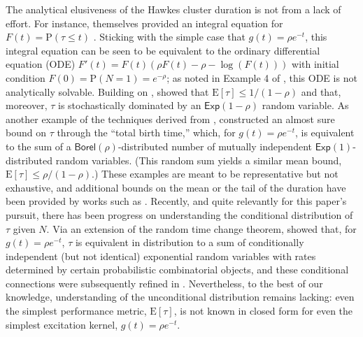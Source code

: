 \documentclass[opre,nonblindrev]{informs3_no_remark}
\newcommand{\E}[1]{{\mathrm{E}\left[#1\right]}}
\newcommand{\PP}[1]{\mathrm{P}\left( #1 \right)}
\begin{document}
The analytical elusiveness of the Hawkes cluster duration is not from a lack of effort. For instance, \citet{moller2005perfect} themselves provided an integral equation for $F(t) = \PP{\tau \leq t}$ \citep[Prop. 2 therein, which the authors describe as a generalization of Theorem 5 from][]{hawkes1974cluster}. Sticking with the simple case that $g(t) = \rho e^{-t}$, this integral equation can be seen to be equivalent to the ordinary differential equation (ODE) $F'(t) = F(t)\left(\rho F(t) - \rho - \log(F(t))\right)$ with initial condition $F(0) = \PP{N = 1} = e^{-\rho}$; as noted in Example 4 of \citet{moller2005perfect}, this ODE is not analytically solvable. Building on \citet{moller2005perfect}, \citet{graham2021regenerative} showed that $\E{\tau} \leq 1/(1-\rho)$ and that, moreover, $\tau$ is stochastically dominated by an $\mathsf{Exp}(1-\rho)$ random variable. As another example of the techniques  derived from \citet{hawkes1974cluster}, \citet{chen2021perfect} constructed an almost sure bound on $\tau$ through the ``total birth time,'' which, for $g(t) = \rho e^{-t}$, is equivalent to the sum of a $\mathsf{Borel}(\rho)$-distributed number of mutually independent $\mathsf{Exp}(1)$-distributed random variables. (This random sum yields a similar mean bound, $\E{\tau} \leq \rho/(1-\rho)$.) 
These examples are meant to be representative but not exhaustive, and additional bounds on the mean or the tail of the duration have been provided by works such as \citet{bremaud2002rate,chen2020perfect,costa2020renewal,reynaud2007some}. 
Recently, and quite relevantly for this paper's pursuit, there has been progress on understanding the conditional distribution of $\tau$ given $N$. Via an extension of the random time change theorem, \citet{daw2023conditional} showed that, for $g(t) = \rho e^{-t}$, $\tau$ is equivalent in distribution to a sum of conditionally independent (but not identical) exponential random variables with rates determined by certain probabilistic combinatorial objects, and these conditional connections were subsequently refined in \citet{daw2026asymmetries}.
Nevertheless, to the best of our knowledge, understanding of the unconditional distribution remains lacking: even the simplest performance metric, $\E{\tau}$, is not known in closed form for even the simplest excitation kernel, $g(t) = \rho e^{-t}$.



\end{document}
